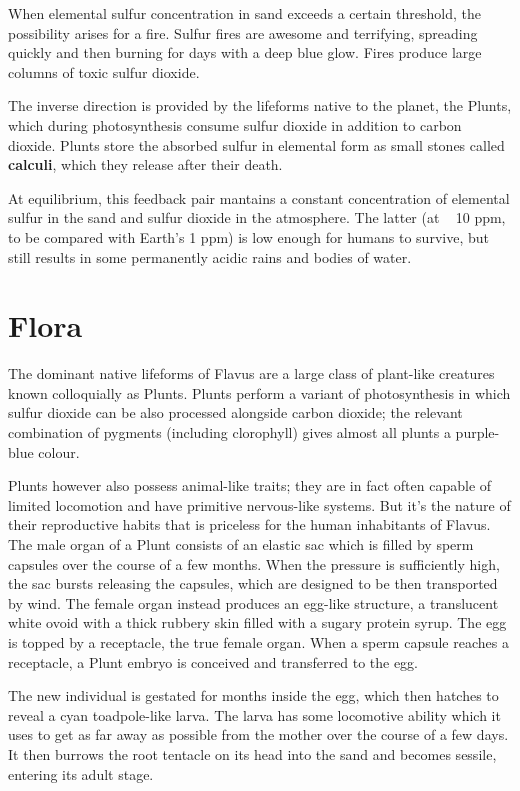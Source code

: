 \documentclass[10pt,oneside]{memoir}
\begin{document}
When elemental sulfur concentration in sand exceeds a certain threshold, the possibility arises for a fire. Sulfur fires are awesome and terrifying, spreading quickly and then burning for days with a deep blue glow. Fires produce large columns of toxic sulfur dioxide.

The inverse direction is provided by the lifeforms native to the planet, the Plunts, which during photosynthesis consume sulfur dioxide in addition to carbon dioxide. Plunts store the absorbed sulfur in elemental form as small stones called \textbf{calculi}, which they release after their death.

At equilibrium, this feedback pair mantains a constant concentration of elemental sulfur in the sand and sulfur dioxide in the atmosphere. The latter (at ~ 10 ppm, to be compared with Earth's 1 ppm) is low enough for humans to survive, but still results in some permanently acidic rains and bodies of water.
\vfill
\pagebreak

\section{Flora}

The dominant native lifeforms of Flavus are a large class of plant-like creatures known colloquially as Plunts. Plunts perform a variant of photosynthesis in which sulfur dioxide can be also processed alongside carbon dioxide; the relevant combination of pygments (including clorophyll) gives almost all plunts a purple-blue colour.

Plunts however also possess animal-like traits; they are in fact often capable of limited locomotion and have primitive nervous-like systems. But it's the nature of their reproductive habits that is priceless for the human inhabitants of Flavus. The male organ of a Plunt consists of an elastic sac which is filled by sperm capsules over the course of a few months. When the pressure is sufficiently high, the sac bursts releasing the capsules, which are designed to be then transported by wind. The female organ instead produces an egg-like structure, a translucent white ovoid with a thick rubbery skin filled with a sugary protein syrup. The egg is topped by a receptacle, the true female organ. When a sperm capsule reaches a receptacle, a Plunt embryo is conceived and transferred to the egg.

The new individual is gestated for months inside the egg, which then hatches to reveal a cyan toadpole-like larva. The larva has some locomotive ability which it uses to get as far away as possible from the mother over the course of a few days. It then burrows the root tentacle on its head into the sand and becomes sessile, entering its adult stage.
\end{document}
